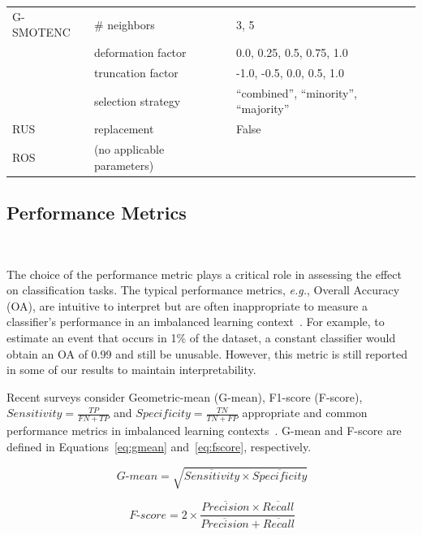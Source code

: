 \begin{table}[ht]
\begin{tabular}{lll}
		G-SMOTENC       & \# neighbors                     & 3, 5                           \\
                        & deformation factor               & 0.0, 0.25, 0.5, 0.75, 1.0      \\
                        & truncation factor                & -1.0, -0.5, 0.0, 0.5, 1.0      \\
                        & selection strategy               & ``combined'',
                        ``minority'', ``majority''\\
		RUS             & replacement                      & False                          \\
		ROS             & (no applicable parameters)       &                                \\
		\bottomrule
	\end{tabular}
\end{table}

\subsection{Performance Metrics}~\label{sec:performance_metrics-gsmotenc}

The choice of the performance metric plays a critical role in assessing
the effect on classification tasks. The typical performance metrics,
\textit{e.g.}, Overall Accuracy (OA), are intuitive to interpret but are often
inappropriate to measure a classifier's performance in an imbalanced learning
context~\cite{sun2009classification}. For example, to estimate an event that
occurs in 1\% of the dataset, a constant classifier would obtain an OA of 0.99
and still be unusable. However, this metric is still reported in some of our
results to maintain interpretability.

Recent surveys consider Geometric-mean (G-mean), F1-score
(F-score), $Sensitivity = \frac{TP}{FN+TP}$ and $Specificity = \frac{TN}{TN +
FP}$ appropriate and common performance metrics in imbalanced learning
contexts~\cite{rout2018handling, Jeni2013,
japkowicz2013assessment}. G-mean and F-score are defined
in Equations~\ref{eq:gmean} and~\ref{eq:fscore}, respectively.

\begin{equation}~\label{eq:gmean}
    \ensuremath{\textit{G-mean}} = \sqrt{\overline{Sensitivity} \times
    \overline{Specificity}}
\end{equation}

\begin{equation}~\label{eq:fscore}
    \ensuremath{\textit{F-score}} = 2\times\frac{\overline{Precision} \times
    \overline{Recall}}{\overline{Precision} + \overline{Recall}}
\end{equation}


